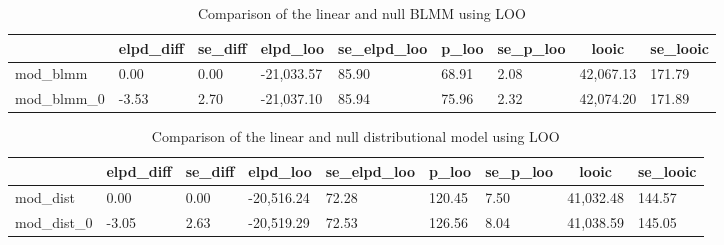 \documentclass[
  doc,12pt,floatsintext]{apa7}
\begin{document}
\begin{table}[tbp]

\begin{center}
\begin{threeparttable}

\caption{\label{tab:loo-blmm-table}Comparison of the linear and null BLMM using LOO}

\begin{tabular}{lllllllll}
\toprule
 & \multicolumn{1}{c}{elpd\_diff} & \multicolumn{1}{c}{se\_diff} & \multicolumn{1}{c}{elpd\_loo} & \multicolumn{1}{c}{se\_elpd\_loo} & \multicolumn{1}{c}{p\_loo} & \multicolumn{1}{c}{se\_p\_loo} & \multicolumn{1}{c}{looic} & \multicolumn{1}{c}{se\_looic}\\
\midrule
mod\_blmm & 0.00 & 0.00 & -21,033.57 & 85.90 & 68.91 & 2.08 & 42,067.13 & 171.79\\
mod\_blmm\_0 & -3.53 & 2.70 & -21,037.10 & 85.94 & 75.96 & 2.32 & 42,074.20 & 171.89\\
\bottomrule
\end{tabular}

\end{threeparttable}
\end{center}

\end{table}

\begin{table}[tbp]

\begin{center}
\begin{threeparttable}

\caption{\label{tab:loo-dist-table}Comparison of the linear and null distributional model using LOO}

\begin{tabular}{lllllllll}
\toprule
 & \multicolumn{1}{c}{elpd\_diff} & \multicolumn{1}{c}{se\_diff} & \multicolumn{1}{c}{elpd\_loo} & \multicolumn{1}{c}{se\_elpd\_loo} & \multicolumn{1}{c}{p\_loo} & \multicolumn{1}{c}{se\_p\_loo} & \multicolumn{1}{c}{looic} & \multicolumn{1}{c}{se\_looic}\\
\midrule
mod\_dist & 0.00 & 0.00 & -20,516.24 & 72.28 & 120.45 & 7.50 & 41,032.48 & 144.57\\
mod\_dist\_0 & -3.05 & 2.63 & -20,519.29 & 72.53 & 126.56 & 8.04 & 41,038.59 & 145.05\\
\bottomrule
\end{tabular}

\end{threeparttable}
\end{center}

\end{table}
\end{document}
